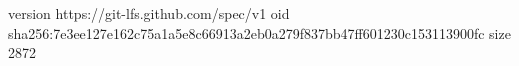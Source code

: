 version https://git-lfs.github.com/spec/v1
oid sha256:7e3ee127e162c75a1a5e8c66913a2eb0a279f837bb47ff601230c153113900fc
size 2872
